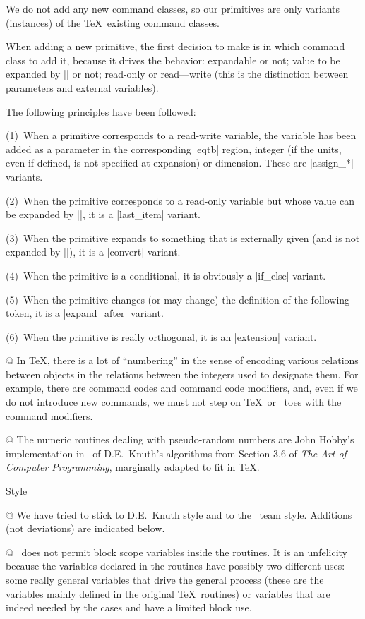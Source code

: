 We do not add any new command classes, so our primitives are only variants
(instances) of the \TeX\ existing command classes.

When adding a new primitive, the first decision to make is in which
command class to add it, because it drives the behavior: expandable
or not; value to be expanded by |\the| or not; read-only or read---write
(this is the distinction between parameters and external variables).

The following principles have been followed:

(1)~When a primitive corresponds to a read-write variable, the variable
has been added as a parameter in the corresponding |eqtb| region,
integer (if the units, even if defined, is not specified at expansion)
or dimension. These are |assign_*| variants.

(2)~When the primitive corresponds to a read-only variable but whose
value can be expanded by |\the|, it is a |last_item| variant.

(3)~When the primitive expands to something that is externally given
(and is not expanded by |\the|), it is a |convert| variant.

(4)~When the primitive is a conditional, it is obviously a |if_else|
variant.

(5)~When the primitive changes (or may change) the definition of the
following token, it is a |expand_after| variant.

(6)~When the primitive is really orthogonal, it is an |extension|
variant.

@ In \TeX, there is a lot of ``numbering'' in the sense of encoding
various relations between objects in the relations between the integers
used to designate them. For example, there are command codes and
command code modifiers, and, even if we do not introduce new commands,
we must not step on \TeX\ or \eTeX\ toes with the command
modifiers.

@ The numeric routines dealing with pseudo-random numbers are
John Hobby's implementation in \MP\ of D.E.~Knuth's algorithms from
Section 3.6 of {\sl The Art of Computer Programming}, marginally adapted
to fit in \TeX.

\enddiv %

\begindiv Style

@ We have tried to stick to D.E.~Knuth style and to the \NTS\ team
style. Additions (not deviations) are indicated below.

@ \PASCAL\ does not permit block scope variables inside the routines. It
is an unfelicity because the variables declared in the
routines have possibly two different uses: some really general
variables that drive the general process (these are the
variables mainly defined in the original \TeX\ routines) or variables
that are indeed needed by the cases and have a limited block use.


